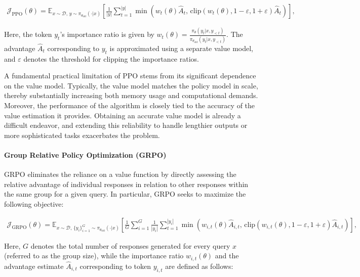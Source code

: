 \begin{align}
\mathcal{J}_\text{PPO}(\theta) = \mathbb{E}_{ x \sim \mathcal{D},\, y \sim \pi_{\theta_\text{old}}( \cdot | x) }
\left[ \frac{1}{|y|} \sum_{t=1}^{|y|} 
\min \left( w_{t}(\theta) \widehat{A}_{t},  \, \mathrm{clip} \left( w_{t}(\theta), 1 - {\varepsilon}, 1 + {\varepsilon}\right) \widehat{A}_{t} \right)
\right],
\end{align}

Here, the token $y_t$'s importance ratio is given by $
w_{t}(\theta) = \frac{ \pi_{\theta} (y_{t} | x, y_{<t}) }{ \pi_{\theta_\text{old}} (y_{t} | x,y_{<t})} $. The advantage $\widehat{A}_{t}$ corresponding to $y_t$ is approximated using a separate value model, and $\varepsilon$ denotes the threshold for clipping the importance ratios.

A fundamental practical limitation of PPO stems from its significant dependence on the value model. Typically, the value model matches the policy model in scale, thereby substantially increasing both memory usage and computational demands. Moreover, the performance of the algorithm is closely tied to the accuracy of the value estimation it provides. Obtaining an accurate value model is already a difficult endeavor, and extending this reliability to handle lengthier outputs or more sophisticated tasks exacerbates the problem.

\paragraph{Group Relative Policy Optimization (GRPO)} GRPO \citep{grpo} eliminates the reliance on a value function by directly assessing the relative advantage of individual responses in relation to other responses within the same group for a given query. In particular, GRPO seeks to maximize the following objective:

\begin{align}
\label{equ:grpo}
\mathcal{J}_\text{GRPO}(\theta) = \mathbb{E}_{ x \sim \mathcal{D},\, \{y_i\}_{i=1}^G \sim \pi_{\theta_\text{old}}( \cdot | x) }
\left[ \frac{1}{G} \sum_{i=1}^{G} \frac{1}{|y_i|} \sum_{t=1}^{|y_i|} 
\min \left( w_{i,t}(\theta) \widehat{A}_{i,t},  \, \mathrm{clip} \left( w_{i,t}(\theta), 1 - {\varepsilon}, 1 + {\varepsilon}\right) \widehat{A}_{i,t} \right)
\right],
\end{align}

Here, $G$ denotes the total number of responses generated for every query $x$ (referred to as the group size), while the importance ratio $w_{i,t}(\theta)$ and the advantage estimate $\widehat{A}_{i,t}$ corresponding to token $y_{i,t}$ are defined as follows:

